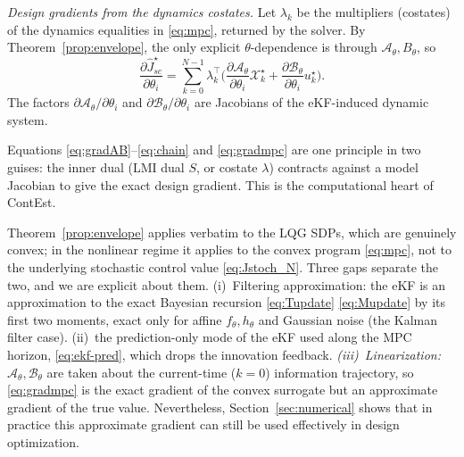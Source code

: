 \documentclass[twocolumn,amsthm]{autart}
\begin{document}
\emph{Design gradients from the dynamics costates.} Let $\lambda_k$ be the
multipliers (costates) of the dynamics equalities in \eqref{eq:mpc}, returned by
the solver. By Theorem~\ref{prop:envelope}, the only explicit
$\theta$-dependence is through $\mathcal A_\theta, B_\theta$,
so
\begin{equation}\label{eq:gradmpc}
\frac{\partial \widehat J^\star_{sc}}{\partial \theta_i} = \sum_{k=0}^{N-1} \lambda_k^\top \Big(
\frac{\partial \mathcal A_\theta}{\partial \theta_i}\mathcal X_k^\star +
\frac{\partial \mathcal B_\theta}{\partial \theta_i} u_k^\star \Big).
\end{equation}
The factors $\partial \mathcal A_\theta/\partial\theta_i$ and
$\partial \mathcal B_\theta/\partial\theta_i$ are Jacobians of the
eKF-induced dynamic system.

\begin{rem}
Equations \eqref{eq:gradAB}--\eqref{eq:chain} and \eqref{eq:gradmpc} are one
principle in two guises: the inner dual (LMI dual $S$, or costate $\lambda$)
contracts against a model Jacobian to give the exact design gradient. This is the
computational heart of ContEst.
\end{rem}

\begin{rem}\label{rem:ekfbreaks}
Theorem~\ref{prop:envelope} applies verbatim to the LQG SDPs, which are genuinely
convex; in the nonlinear regime it applies to the convex program \eqref{eq:mpc},
not to the underlying stochastic control value \eqref{eq:Jstoch_N}. Three gaps
separate the two, and we are explicit about them. (i)~Filtering
approximation: the eKF is an approximation to the exact Bayesian recursion
\eqref{eq:Tupdate} \eqref{eq:Mupdate} by its first two moments, exact only for
affine $f_\theta,h_\theta$ and Gaussian noise \cite{anderson2012optimal} (the Kalman filter case).
(ii)~the prediction-only mode of the eKF used along the MPC horizon,
\eqref{eq:ekf-pred}, which drops the innovation feedback. \emph{(iii)~Linearization:} $\mathcal A_\theta,
\mathcal B_\theta$ are taken about the current-time ($k=0$) information trajectory, so
\eqref{eq:gradmpc} is the exact gradient of the convex surrogate but an
approximate gradient of the true value. Nevertheless, Section~\ref{sec:numerical} shows that in practice this approximate gradient can still be used effectively in design optimization.
\end{rem}
\end{document}
